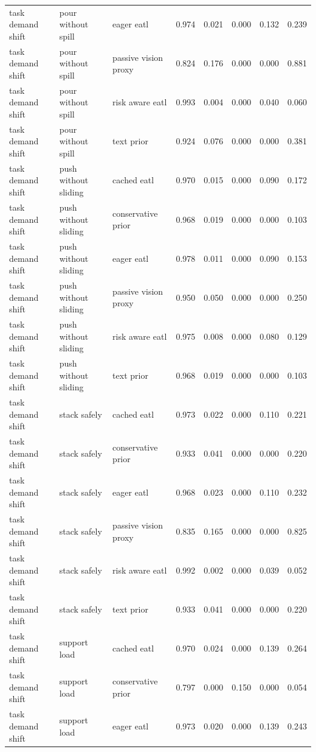\begin{longtable}{lllrrrrr}
task demand shift & pour without spill & eager eatl & 0.974 & 0.021 & 0.000 & 0.132 & 0.239 \\
task demand shift & pour without spill & passive vision proxy & 0.824 & 0.176 & 0.000 & 0.000 & 0.881 \\
task demand shift & pour without spill & risk aware eatl & 0.993 & 0.004 & 0.000 & 0.040 & 0.060 \\
task demand shift & pour without spill & text prior & 0.924 & 0.076 & 0.000 & 0.000 & 0.381 \\
\midrule
task demand shift & push without sliding & cached eatl & 0.970 & 0.015 & 0.000 & 0.090 & 0.172 \\
task demand shift & push without sliding & conservative prior & 0.968 & 0.019 & 0.000 & 0.000 & 0.103 \\
task demand shift & push without sliding & eager eatl & 0.978 & 0.011 & 0.000 & 0.090 & 0.153 \\
task demand shift & push without sliding & passive vision proxy & 0.950 & 0.050 & 0.000 & 0.000 & 0.250 \\
task demand shift & push without sliding & risk aware eatl & 0.975 & 0.008 & 0.000 & 0.080 & 0.129 \\
task demand shift & push without sliding & text prior & 0.968 & 0.019 & 0.000 & 0.000 & 0.103 \\
\midrule
task demand shift & stack safely & cached eatl & 0.973 & 0.022 & 0.000 & 0.110 & 0.221 \\
task demand shift & stack safely & conservative prior & 0.933 & 0.041 & 0.000 & 0.000 & 0.220 \\
task demand shift & stack safely & eager eatl & 0.968 & 0.023 & 0.000 & 0.110 & 0.232 \\
task demand shift & stack safely & passive vision proxy & 0.835 & 0.165 & 0.000 & 0.000 & 0.825 \\
task demand shift & stack safely & risk aware eatl & 0.992 & 0.002 & 0.000 & 0.039 & 0.052 \\
task demand shift & stack safely & text prior & 0.933 & 0.041 & 0.000 & 0.000 & 0.220 \\
\midrule
task demand shift & support load & cached eatl & 0.970 & 0.024 & 0.000 & 0.139 & 0.264 \\
task demand shift & support load & conservative prior & 0.797 & 0.000 & 0.150 & 0.000 & 0.054 \\
task demand shift & support load & eager eatl & 0.973 & 0.020 & 0.000 & 0.139 & 0.243 \\

\end{longtable}
